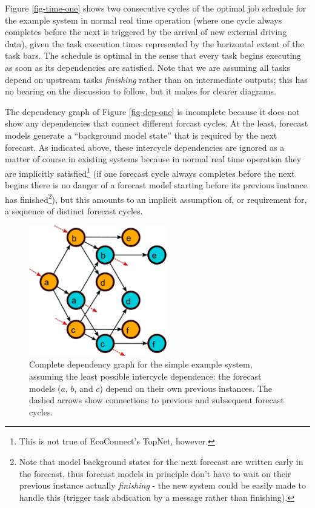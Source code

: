 \documentclass[11pt,a4paper]{article}
\begin{document}
Figure \ref{fig-time-one} shows two consecutive cycles of the optimal
job schedule for the example system in normal real time operation (where
one cycle always completes before the next is triggered by the arrival
of new external driving data), given the task execution times
represented by the horizontal extent of the task bars. The schedule is
optimal in the sense that every task begins executing as soon as its
dependencies are satisfied. Note that we are assuming all tasks depend
on upstream tasks {\em finishing} rather than on intermediate outputs;
this has no bearing on the discussion to follow, but it makes for
clearer diagrams.  

The dependency graph of Figure \ref{fig-dep-one} is incomplete because
it does not show any dependencies that connect different forcast cycles.
At the least, forecast models generate a ``background model state''
that is required by the next forecast. As indicated above, these
intercycle dependencies are ignored as a matter of course in existing
systems because in normal real time operation they are implicitly
satisfied\footnote{This is not true of EcoConnect's TopNet, however.}
(if one forecast cycle always completes before the next begins there is
no danger of a forecast model starting before its previous instance has
finished\footnote{Note that model background states for the next
forecast are written early in the forecast, thus forecast models in
principle don't have to wait on their previous instance actually {\em
finishing} - the new system could be easily made to handle this (trigger
task abdication by a message rather than finishing).}), but this amounts
to an implicit assumption of, or requirement for, a sequence of distinct
forecast cycles. 

\begin{figure} \begin{center}
    \includegraphics[width=6cm]{dependencies-two} \end{center}
    \caption{\small Complete dependency graph for the simple example
    system, assuming the least possible intercycle dependence: the
    forecast models ($a$, $b$, and $c$) depend on their own previous
    instances. The dashed arrows show connections to previous and
    subsequent forecast cycles.} 
    \label{fig-dep-two}
\end{figure}
\end{document}
